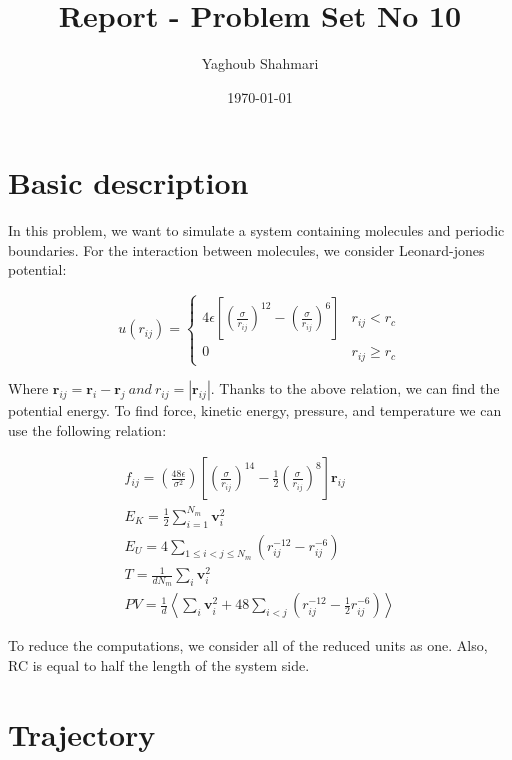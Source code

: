 \documentclass{article}
\author{Yaghoub Shahmari}
\title{Report - Problem Set No 10}
\date{\today}
\begin{document}
    \maketitle
    \section*{Basic description}

    In this problem, we want to simulate a system containing molecules and periodic boundaries. For the interaction between molecules, we consider Leonard-jones potential:

    $$u\left(r_{i j}\right)= \begin{cases}4 \epsilon\left[\left(\frac{\sigma}{r_{i j}}\right)^{12}-\left(\frac{\sigma}{r_{i j}}\right)^{6}\right] & r_{i j}<r_{c} \\ 0 & r_{i j} \geq r_{c}\end{cases}$$

    Where $\textbf{r}_{ij} = \textbf{r}_i - \textbf{r}_j\ and\ r_{ij} = |\textbf{r}_{ij}|$. Thanks to the above relation, we can find the potential energy. To find force, kinetic energy, pressure, and temperature we can use the following relation:

    $$
    \begin{gathered}
    f_{i j}=\left(\frac{48 \epsilon}{\sigma^{2}}\right)\left[\left(\frac{\sigma}{r_{i j}}\right)^{14}-\frac{1}{2}\left(\frac{\sigma}{r_{i j}}\right)^{8}\right] \boldsymbol{r}_{i j} \\
    E_{K}=\frac{1}{2} \sum_{i=1}^{N_{m}} \boldsymbol{v}_{i}^{2} \\
    E_{U}=4 \sum_{1 \leq i<j \leq N_{m}}\left(r_{i j}^{-12}-r_{i j}^{-6}\right) \\
    T=\frac{1}{d N_{m}} \sum_{i} \boldsymbol{v}_{i}^{2} \\
    P V=\frac{1}{d}\left\langle\sum_{i} \boldsymbol{v}_{i}^{2}+48 \sum_{i<j}\left(r_{i j}^{-12}-\frac{1}{2} r_{i j}^{-6}\right)\right\rangle
    \end{gathered}
    $$

    To reduce the computations, we consider all of the reduced units as one. Also, RC is equal to half the length of the system side.
    
    \pagebreak

    \section*{Trajectory}
\end{document}
